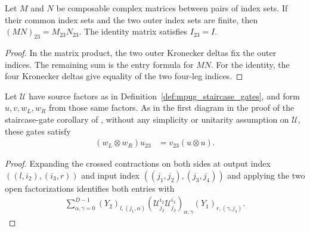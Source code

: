\begin{lemma}
    \label{thm:mpug_staircase_middle_composition}
    \leanok
    Let $M$ and $N$ be composable complex matrices between pairs of index
    sets. If their common index sets and the two outer index sets are finite,
    then $(MN)_{23}=M_{23}N_{23}$. The identity matrix satisfies $I_{23}=I$.
\end{lemma}

\begin{proof}\leanok
    In the matrix product, the two outer Kronecker deltas fix the outer
    indices. The remaining sum is the entry formula for $MN$.
    For the identity, the four Kronecker deltas give equality of the two
    four-leg indices.
\end{proof}

\begin{lemma}
    \label{thm:mpug_staircase_network_uncancelled}
    \leanok
    Let $\mathcal U$ have source factors as in
    Definition~\ref{def:mpug_staircase_gates}, and form $u,v,w_L,w_R$
    from those same factors. As in the first diagram in the proof of the
    staircase-gate corollary of
    \cite[lines~918--968]{FrancoRubio2025MPUGauging}, without any simplicity or
    unitarity assumption on $\mathcal U$, these gates satisfy
    \begin{align}
        (w_L\otimes w_R)u_{23} & =v_{23}(u\otimes u).
        \label{eq:mpug_staircase_network_uncancelled}
    \end{align}
\end{lemma}

\begin{proof}\leanok
    Expanding the crossed contractions on both sides at output index
    $((l,i_2),(i_3,r))$ and input index $((j_1,j_2),(j_3,j_4))$ and applying
    the two open factorizations identifies both entries with
    \begin{align}
        \sum_{\alpha,\gamma=0}^{D-1}
        (Y_2)_{l,(j_1,\alpha)}
        (\mathcal U^{i_2}_{j_2}\mathcal U^{i_3}_{j_3})_{\alpha,\gamma}
        (Y_1)_{r,(\gamma,j_4)}.
    \end{align}
\end{proof}

